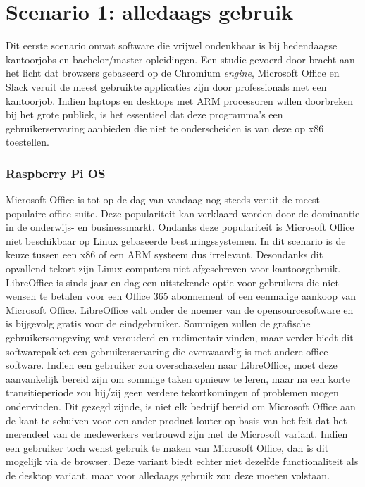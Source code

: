 \newpage
\section{Scenario 1: alledaags gebruik}
Dit eerste scenario omvat software die vrijwel ondenkbaar is bij hedendaagse kantoorjobs en bachelor/master opleidingen. Een studie gevoerd door \textcite{Braganza2022} bracht aan het licht dat browsers gebaseerd op de Chromium \textit{engine}, Microsoft Office en Slack veruit de meest gebruikte applicaties zijn door professionals met een kantoorjob. Indien laptops en desktops met ARM processoren willen doorbreken bij het grote publiek, is het essentieel dat deze programma’s een gebruikerservaring aanbieden die niet te onderscheiden is van deze op x86 toestellen.

\subsubsection{Raspberry Pi OS}
Microsoft Office is tot op de dag van vandaag nog steeds veruit de meest populaire office suite. Deze populariteit kan verklaard worden door de dominantie in de onderwijs- en businessmarkt. Ondanks deze populariteit is Microsoft Office niet beschikbaar op Linux gebaseerde besturingssystemen. In dit scenario is de keuze tussen een x86 of een ARM systeem dus irrelevant. Desondanks dit opvallend tekort zijn Linux computers niet afgeschreven voor kantoorgebruik. LibreOffice is sinds jaar en dag een uitstekende optie voor gebruikers die niet wensen te betalen voor een Office 365 abonnement of een eenmalige aankoop van Microsoft Office. LibreOffice valt onder de noemer van de opensourcesoftware en is bijgevolg gratis voor de eindgebruiker. Sommigen zullen de grafische gebruikersomgeving wat verouderd en rudimentair vinden, maar verder biedt dit softwarepakket een gebruikerservaring die evenwaardig is met andere office software. Indien een gebruiker zou overschakelen naar LibreOffice, moet deze aanvankelijk bereid zijn om sommige taken opnieuw te leren, maar na een korte transitieperiode zou hij/zij geen verdere tekortkomingen of problemen mogen ondervinden. Dit gezegd zijnde, is niet elk bedrijf bereid om Microsoft Office aan de kant te schuiven voor een ander product louter op basis van het feit dat het merendeel van de medewerkers vertrouwd zijn met de Microsoft variant. Indien een gebruiker toch wenst gebruik te maken van Microsoft Office, dan is dit mogelijk via de browser. Deze variant biedt echter niet dezelfde functionaliteit als de desktop variant, maar voor alledaags gebruik zou deze moeten volstaan.

